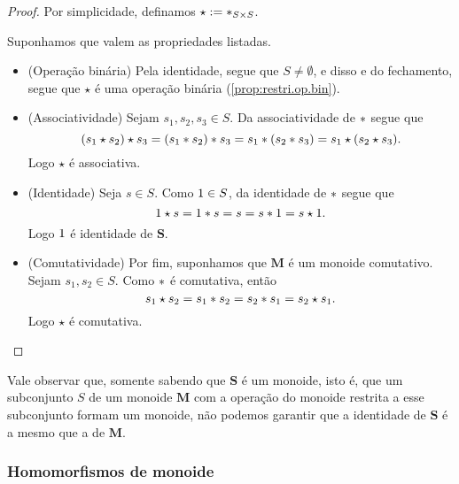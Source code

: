 \begin{proof} Por simplicidade, definamos $\star :=  \ast _{S \times S}$.


Suponhamos que valem as propriedades listadas.
	\begin{itemize}
	\item (Operação binária) Pela identidade, segue que $S \neq \emptyset$, e disso e do fechamento, segue que $\star$ é uma operação binária (\ref{prop:restri.op.bin}).
	\item (Associatividade) Sejam $s_1,s_2,s_3 \in S$. Da associatividade de $ \ast $ segue que
		\begin{equation*}
		(s_1 \star s_2) \star s_3 = (s_1 \ast s_2) \ast s_3 = s_1 \ast (s_2  \ast  s_3) = s_1 \star (s_2 \star s_3).
		\end{equation*}
	Logo $\star$ é associativa.
	\item (Identidade) Seja $s \in S$. Como $1 \in S$, da identidade de $ \ast $ segue que
		\begin{equation*}
		1 \star s = 1 \ast s = s = s \ast 1 = s \star 1.
		\end{equation*}
	Logo $1$ é identidade de $\bm S$.
	\item (Comutatividade) Por fim, suponhamos que $\bm M$ é um monoide comutativo. Sejam $s_1,s_2 \in S$. Como $ \ast $ é comutativa, então
		\begin{equation*}
		s_1 \star s_2 = s_1 \ast s_2 = s_2 \ast s_1 = s_2 \star s_1.
		\end{equation*}
	Logo $\star$ é comutativa.
	\qedhere
	\end{itemize}
\end{proof}

Vale observar que, somente sabendo que $\bm S$ é um monoide, isto é, que um subconjunto $S$ de um monoide $\bm M$ com a operação do monoide restrita a esse subconjunto formam um monoide, não podemos garantir que a identidade de $\bm S$ é a mesmo que a de $\bm M$.

\subsubsection{Homomorfismos de monoide}

